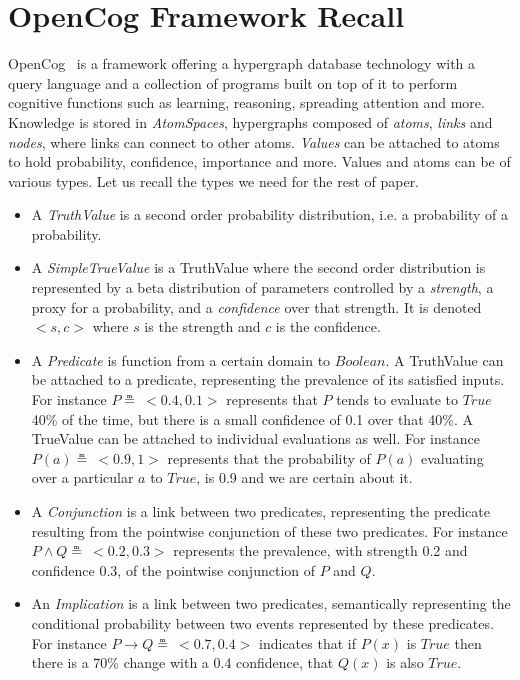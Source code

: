 \documentclass[runningheads]{llncs}
\newcommand{\TTrue}{\textit{True}}
\newcommand{\limp}{\rightarrow}
\begin{document}

\section{OpenCog Framework Recall}
\label{sec:opencog}
OpenCog~\cite{Hart2008} is a framework offering a hypergraph database
technology with a query language and a collection of programs built on
top of it to perform cognitive functions such as learning, reasoning,
spreading attention and more.  Knowledge is stored in
\emph{AtomSpaces}, hypergraphs composed of \emph{atoms}, \emph{links}
and \emph{nodes}, where links can connect to other atoms.
\emph{Values} can be attached to atoms to hold probability,
confidence, importance and more.  Values and atoms can be of various
types.  Let us recall the types we need for the rest of paper.
\begin{itemize}
\item A \emph{TruthValue} is a second order probability distribution,
  i.e. a probability of a probability.
\item A \emph{SimpleTrueValue} is a TruthValue where the second order
  distribution is represented by a beta distribution of parameters
  controlled by a \emph{strength}, a proxy for a probability, and a
  \emph{confidence} over that strength.  It is denoted $<\!s, c\!>$ where
  $s$ is the strength and $c$ is the confidence.
\item A \emph{Predicate} is function from a certain domain to
  $Boolean$.  A TruthValue can be attached to a predicate,
  representing the prevalence of its satisfied inputs.  For instance
  $P \measeq\ <\!0.4, 0.1\!>$ represents that $P$ tends to evaluate to
  $\TTrue$ 40\% of the time, but there is a small confidence of 0.1
  over that 40\%.  A TrueValue can be attached to individual
  evaluations as well.  For instance $P(a) \measeq\ <\!0.9, 1\!>$
  represents that the probability of $P(a)$ evaluating over a
  particular $a$ to $\TTrue$, is 0.9 and we are certain about it.
\item A \emph{Conjunction} is a link between two predicates,
  representing the predicate resulting from the pointwise conjunction
  of these two predicates.  For instance
  $P \land Q \measeq\ <\!0.2, 0.3\!>$ represents the prevalence, with
  strength 0.2 and confidence 0.3, of the pointwise conjunction of $P$
  and $Q$.
\item An \emph{Implication} is a link between two predicates,
  semantically representing the conditional probability between two
  events represented by these predicates.  For instance
  $P \limp Q \measeq\ <\!0.7, 0.4\!>$ indicates that if $P(x)$ is
  $\TTrue$ then there is a 70\% change with a 0.4 confidence,
  that $Q(x)$ is also $\TTrue$.
\end{itemize}
\end{document}
